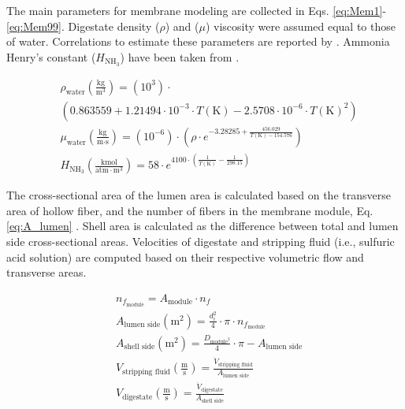 \begin{refsection}[referencesApD]
The main parameters for membrane modeling are collected in Eqs. \ref{eq:Mem1}-\ref{eq:Mem99}. Digestate density ($\rho$) and ($\mu$) viscosity were assumed equal to those of water. Correlations to estimate these parameters are reported by \citet{hsu1997densities}. Ammonia Henry's constant ($H_{\text{NH}_3}$)
have been taken from \citet{linstrom2001nist}.

\begin{align}
& \rho_{\text{water}} \left(\frac{\text{kg}}{\text{m}^3}\right) = (10^3) \cdot \nonumber \\
& \left(0.863559+1.21494 \cdot 10^{-3} \cdot T(\text{K}) - 2.5708 \cdot 10^{-6} \cdot T(\text{K})^2\right) \label{eq:Mem1} 
\\
& \mu_{\text{water}} \left(\frac{\text{kg}}{\text{m} \cdot \text{s}}\right) = (10^{-6}) \cdot \left(\rho \cdot e^{-3.28285+\frac{456.029}{T(\text{K})-154.576}}\right) \label{eq:Mem2} 
\\
& H_{\text{NH}_3} \left(\frac{\text{kmol}}{\text{atm} \cdot \text{m}^3}\right) = 58 \cdot e^{4100 \cdot \left(\frac{1}{T(\text{K})} - \frac{1}{298.15}\right)}
\label{eq:Mem3}
\end{align}

The cross-sectional area of the lumen area is calculated based on the transverse area of hollow fiber, and the number of fibers in the membrane module, Eq. \ref{eq:A_lumen} . Shell area is calculated as the difference between total and lumen side cross-sectional areas. 
Velocities of digestate and stripping fluid (i.e., sulfuric acid solution) are computed based on their respective volumetric flow and transverse areas.

\begin{align}
& n_{f_{\text{module}}} = A_{\text{module}} \cdot n_f \label{eq:Memnf} 
\\
& A_{\text{lumen side}} \left(\text{m}^2\right) = \frac{d_i^2}{4} \cdot \pi \cdot n_{f_{\text{module}}} \label{eq:A_lumen} 
\\
& A_{\text{shell side}} \left(\text{m}^2\right) = \frac{D_{\text{module}^2}}{4} \cdot \pi - A_{\text{lumen side}} \label{eq:A_shell} 
\\
& V_{\text{stripping fluid}} \left(\frac{\text{m}}{\text{s}}\right) = \frac{\dot{V}_{\text{stripping fluid}}}{A_{\text{lumen side}}} \label{eq:V_stripping}
\\
& V_{\text{digestate}} \left(\frac{\text{m}}{\text{s}}\right) = \frac{\dot{V}_{\text{digestate}}}{A_{\text{shell side}}} \label{eq:V_digestate}
\end{align}


\end{refsection}
